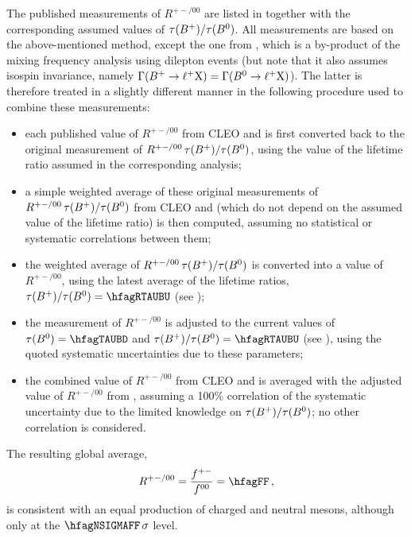 The published measurements of $R^{+-/00}$ are listed 
in  together with the corresponding assumed values of 
$\tau(B^+)/\tau(B^0)$.
All measurements are based on the above-mentioned method, 
except the one from \belle, which is a by-product of the 
\Bd mixing frequency analysis using dilepton events
(but note that it also assumes isospin invariance, 
namely $\Gamma(B^+ \to \ell^+{\rm X}) = \Gamma(B^0 \to \ell^+{\rm X})$).
The latter is therefore treated in a slightly different 
manner in the following procedure used to combine 
these measurements:
\begin{itemize} 
\item each published value of $R^{+-/00}$ from CLEO and \babar
      is first converted back to the original measurement of 
      $R^{+-/00} \, \tau(B^+)/\tau(B^0)$, using the value of the 
      lifetime ratio assumed in the corresponding analysis;
\item a simple weighted average of these original
      measurements of $R^{+-/00} \, \tau(B^+)/\tau(B^0)$ from 
      CLEO and \babar (which do not depend on the assumed value 
      of the lifetime ratio) is then computed, assuming no 
      statistical or systematic correlations between them;


\item the weighted average of $R^{+-/00} \, \tau(B^+)/\tau(B^0)$ 
      is converted into a value of $R^{+-/00}$, using the latest 
      average of the lifetime ratios, $\tau(\Bu)/\tau(\Bd)=\hfagRTAUBU$ 
      (see );
\item the \belle measurement of $R^{+-/00}$ is adjusted to the 
      current values of $\tau(\Bd)=\hfagTAUBD$ and 
      $\tau(\Bu)/\tau(\Bd)=\hfagRTAUBU$ (see ),
      using the quoted systematic uncertainties due to these parameters;
\item the combined value of $R^{+-/00}$ from CLEO and \babar is averaged 
      with the adjusted value of $R^{+-/00}$ from \belle, assuming a 100\% 
      correlation of the systematic uncertainty due to the limited 
      knowledge on $\tau(B^+)/\tau(B^0)$; no other correlation is considered. 
\end{itemize} 
The resulting global average, 
\begin{equation}
R^{+-/00} = \frac{f^{+-}}{f^{00}} =  \hfagFF \,,
\labe{Rplusminus}
\end{equation}
is consistent with an equal production of charged and neutral \B mesons, 
although only at the $\hfagNSIGMAFF\,\sigma$ level.

